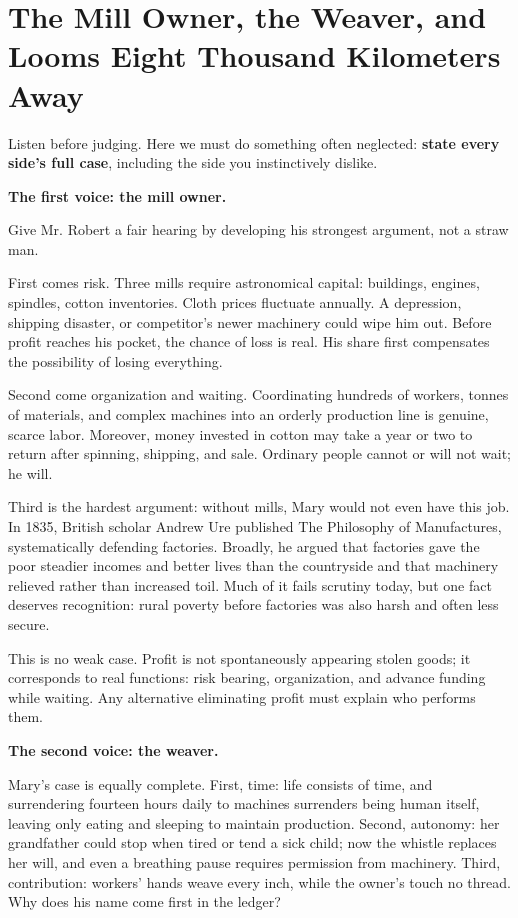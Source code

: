 \section[Mill Owners, Weavers, and Distant Looms]{The Mill Owner, the Weaver, and Looms Eight Thousand Kilometers Away}
Listen before judging. Here we must do something often neglected: \textbf{state every side's full case}, including the side you instinctively dislike.

\textbf{The first voice: the mill owner.}

Give Mr. Robert a fair hearing by developing his strongest argument, not a straw man.

First comes risk. Three mills require astronomical capital: buildings, engines, spindles, cotton inventories. Cloth prices fluctuate annually. A depression, shipping disaster, or competitor's newer machinery could wipe him out. Before profit reaches his pocket, the chance of loss is real. His share first compensates the possibility of losing everything.

Second come organization and waiting. Coordinating hundreds of workers, tonnes of materials, and complex machines into an orderly production line is genuine, scarce labor. Moreover, money invested in cotton may take a year or two to return after spinning, shipping, and sale. Ordinary people cannot or will not wait; he will.

Third is the hardest argument: without mills, Mary would not even have this job. In 1835, British scholar Andrew Ure published The Philosophy of Manufactures, systematically defending factories. Broadly, he argued that factories gave the poor steadier incomes and better lives than the countryside and that machinery relieved rather than increased toil. Much of it fails scrutiny today, but one fact deserves recognition: rural poverty before factories was also harsh and often less secure.

This is no weak case. Profit is not spontaneously appearing stolen goods; it corresponds to real functions: risk bearing, organization, and advance funding while waiting. Any alternative eliminating profit must explain who performs them.

\textbf{The second voice: the weaver.}

Mary's case is equally complete. First, time: life consists of time, and surrendering fourteen hours daily to machines surrenders being human itself, leaving only eating and sleeping to maintain production. Second, autonomy: her grandfather could stop when tired or tend a sick child; now the whistle replaces her will, and even a breathing pause requires permission from machinery. Third, contribution: workers' hands weave every inch, while the owner's touch no thread. Why does his name come first in the ledger?

